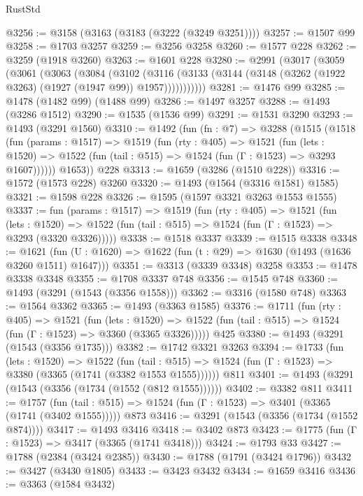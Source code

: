 \begin{lexlean}{RustStd}
\begin{coremodule}
@3256 := @3158 (@3163 (@3183 (@3222 (@3249 @3251))))
@3257 := @1507 @99
@3258 := @1703 @3257
@3259 := @3256 @3258
@3260 := @1577 @228
@3262 := @3259 (@1918 @3260)
@3263 := @1601 @228
@3280 := @2991
    (@3017
      (@3059
        (@3061
          (@3063
            (@3084
              (@3102
                (@3116
                  (@3133 (@3144 (@3148 (@3262 (@1922 @3263) (@1927 (@1947 @99)) @1957)))))))))))
@3281 := @1476 @99
@3285 := @1478 (@1482 @99) (@1488 @99)
@3286 := @1497 @3257
@3288 := @1493 (@3286 @1512)
@3290 := @1535 (@1536 @99)
@3291 := @1531 @3290
@3293 := @1493 (@3291 @1560)
@3310 := @1492
    (fun (fn : @7) =>
    @3288
      (@1515
        (@1518
          (fun (params : @1517) =>
          @1519
            (fun (rty : @405) =>
            @1521
              (fun (lets : @1520) =>
              @1522 (fun (tail : @515) => @1524 (fun (Γ : @1523) => @3293 @1607))))))
        @1653))
    @228
@3313 := @1659 (@3286 (@1510 @228))
@3316 := @1572 (@1573 @228) @3260
@3320 := @1493 (@1564 (@3316 @1581) @1585)
@3321 := @1598 @228
@3326 := @1595 (@1597 @3321 @3263 @1553 @1555)
@3337 := fun (params : @1517) =>
  @1519
    (fun (rty : @405) =>
    @1521
      (fun (lets : @1520) =>
      @1522 (fun (tail : @515) => @1524 (fun (Γ : @1523) => @3293 (@3320 @3326)))))
@3338 := @1518 @3337
@3339 := @1515 @3338
@3348 := @1621 (fun (U : @1620) => @1622 (fun (t : @29) => @1630 (@1493 (@1636 @3260 @1511) @1647)))
@3351 := @3313 (@3339 @3348) @3258
@3353 := @1478 @3338 @3348
@3355 := @1708 @3337 @748
@3356 := @1545 @748
@3360 := @1493 (@3291 (@1543 (@3356 @1558)))
@3362 := @3316 (@1580 @748)
@3363 := @1564 @3362
@3365 := @1493 (@3363 @1585)
@3376 := @1711
    (fun (rty : @405) =>
    @1521
      (fun (lets : @1520) =>
      @1522 (fun (tail : @515) => @1524 (fun (Γ : @1523) => @3360 (@3365 @3326)))))
    @425
@3380 := @1493 (@3291 (@1543 (@3356 @1735)))
@3382 := @1742 @3321 @3263
@3394 := @1733
    (fun (lets : @1520) =>
    @1522
      (fun (tail : @515) => @1524 (fun (Γ : @1523) => @3380 (@3365 (@1741 (@3382 @1553 @1555))))))
    @811
@3401 := @1493 (@3291 (@1543 (@3356 (@1734 (@1552 (@812 @1555))))))
@3402 := @3382 @811
@3411 := @1757
    (fun (tail : @515) => @1524 (fun (Γ : @1523) => @3401 (@3365 (@1741 (@3402 @1555)))))
    @873
@3416 := @3291 (@1543 (@3356 (@1734 (@1552 @874))))
@3417 := @1493 @3416
@3418 := @3402 @873
@3423 := @1775 (fun (Γ : @1523) => @3417 (@3365 (@1741 @3418)))
@3424 := @1793 @33
@3427 := @1788 (@2384 (@3424 @2385))
@3430 := @1788 (@1791 (@3424 @1796))
@3432 := @3427 (@3430 @1805)
@3433 := @3423 @3432
@3434 := @1659 @3416
@3436 := @3363 (@1584 @3432)

\end{coremodule}
\end{lexlean}
